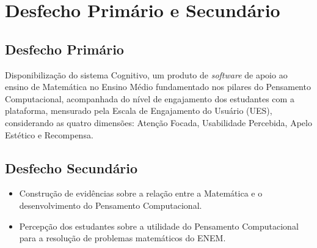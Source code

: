 \chapter{Desfecho Primário e Secundário}

\section{Desfecho Primário}

Disponibilização do sistema Cognitivo, um produto de \textit{software} de apoio ao ensino de Matemática no Ensino Médio fundamentado nos pilares do Pensamento Computacional, acompanhada do nível de engajamento dos estudantes com a plataforma, mensurado pela Escala de Engajamento do Usuário (UES), considerando as quatro dimensões: Atenção Focada, Usabilidade Percebida, Apelo Estético e Recompensa.

\section{Desfecho Secundário}

\begin{itemize}
    \item{} Construção de evidências sobre a relação entre a Matemática e o desenvolvimento do Pensamento Computacional.
    \item{} Percepção dos estudantes sobre a utilidade do Pensamento Computacional para a resolução de problemas matemáticos do ENEM.
\end{itemize}